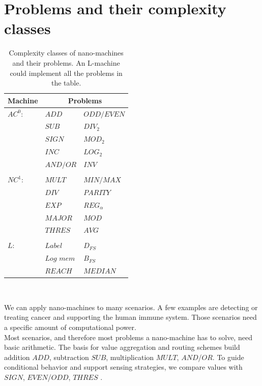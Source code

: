 \documentclass[10pt,sigconf]{acmart}
\begin{document}
\section{Problems and their complexity classes}
\begin{table}[h!]
  \begin{tabular}{ p{1.5cm}|p{2cm} p{2cm}}
    \hline
    Machine & \multicolumn{2}{c}{Problems} \\
    \hline
    $AC^0$: & $ADD$ & $ODD/EVEN$  \\
            & $SUB$ & $DIV_{2}$  \\
            & $SIGN$ & $MOD_{2}$  \\
            & $INC$ & $LOG_{2}$  \\
            & $AND/OR$ & $INV$  \\
            &  &   \\
    $NC^1$:   & $MULT$ &$MIN/MAX$    \\
             & $DIV$ & $PARITY$  \\
             & $EXP$ & $REG_{\alpha}$  \\
             & $MAJOR$ & $MOD$  \\
             & $THRES$ & $AVG$  \\
             &  &   \\
    $L$:      &   $Label$ &$D_{FS}$      \\
             & $Log$ $mem$ & $B_{FS}$  \\
             & $REACH$ & $MEDIAN$  \\
            
    \hline 
  \end{tabular}\\
    
  \caption{Complexity classes of nano-machines and their problems. An L-machine could implement all the problems in the table.}
  \label{table1}
\end{table}
We can apply nano-machines to many scenarios.
A few examples are detecting or treating cancer and supporting the human immune system.
Those scenarios need a specific amount of computational power.\\
Most scenarios, and therefore most problems a nano-machine has to solve, need basic arithmetic.
The basis for value aggregation and routing schemes build addition $ADD$, subtraction $SUB$, multiplication $MULT$, $AND$/$OR$.
To guide conditional behavior and support sensing strategies, we compare values with $SIGN$, $EVEN$/$ODD$, $THRES$ .\\
\end{document}
